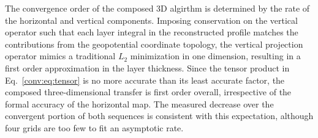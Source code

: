 The convergence order of the composed 3D algirthm is determined by the rate of the horizontal and vertical components. Imposing conservation on the vertical operator such that each \ROMS layer integral in the reconstructed profile matches the contributions from the \MPAS geopotential coordinate topology, the vertical projection operator mimics a traditional $L_2$ minimization in one dimension, resulting in a first order approximation in the layer thickness. Since the tensor product in Eq.~\eqref{conv:eq:tensor} is no more accurate than its least accurate factor, the composed three-dimensional transfer is first order overall, irrespective of the formal accuracy of the horizontal map. The measured decrease over the convergent portion of both sequences is consistent with this expectation, although four grids are too few to fit an asymptotic rate.

